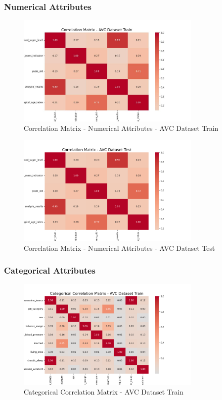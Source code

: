 \documentclass[a4paper,12pt]{article}
\begin{document}
\subsubsection{Numerical Attributes}
\begin{figure}[h!]
    \centering
    \includegraphics[width=0.8\textwidth]{Resources/matrix_avc_train.jpeg}
    \caption{Correlation Matrix - Numerical Attributes - AVC Dataset Train}
\end{figure}

\begin{figure}[h!]
    \centering
    \includegraphics[width=0.8\textwidth]{Resources/matrix_avc_test.png}
    \caption{Correlation Matrix - Numerical Attributes - AVC Dataset Test}
\end{figure}

\newpage
\subsubsection{Categorical Attributes}
\begin{figure}[h!]
    \centering
    \includegraphics[width=0.8\textwidth]{Resources/matrix_categorial_avc_train.png}
    \caption{Categorical Correlation Matrix - AVC Dataset Train}
\end{figure}
\end{document}
